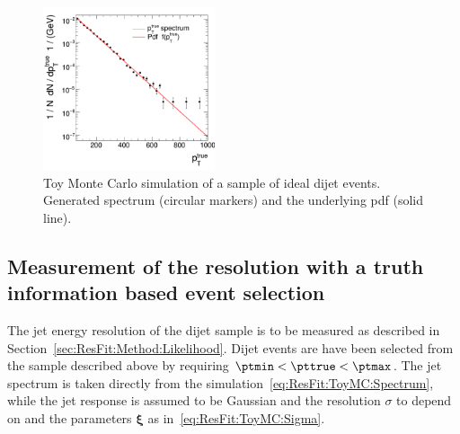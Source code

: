\begin{figure}[ht]
  \begin{center}
     \includegraphics[width=0.45\textwidth]{figures/resFit_ToyMC_PtGenCuts_SpectrumLog}
   \end{center}
   \caption{Toy Monte Carlo simulation of a sample of ideal dijet events.
     Generated \pttrue spectrum (circular markers) and the underlying pdf (solid line).}
   \label{fig:ResFit:ToyMC:Sample:Spectrum}
\end{figure}


\subsection{Measurement of the resolution with a truth information based event selection}\label{sec:ResFit:ToyMC:PtGenCuts}

The jet energy resolution of the dijet sample is to be measured as described in Section~\ref{sec:ResFit:Method:Likelihood}.
Dijet events are have been selected from the sample described above by
requiring \mbox{$\ptmin < \pttrue < \ptmax$}.
The jet \pt spectrum is taken directly from the
simulation~\eqref{eq:ResFit:ToyMC:Spectrum}, while the jet \pt
response is assumed to be Gaussian and the resolution $\sigma$ to
depend on \pttrue and the parameters $\mathbf{\xi}$ as
in~\eqref{eq:ResFit:ToyMC:Sigma}.

